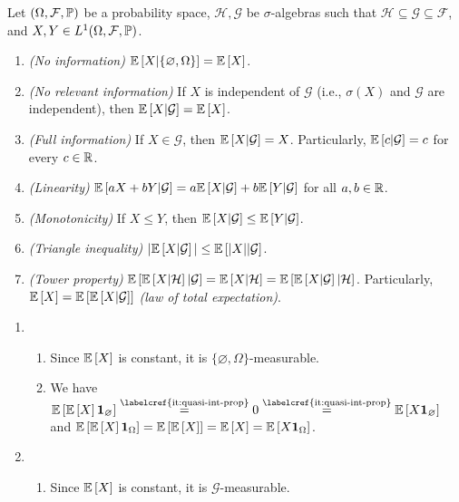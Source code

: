 \begin{enumerate}
\begin{proposition}
\label{prp:cond-exp-prop}
Let \((\Omega,\mathcal{F},\mathbb{P})\) be a probability space, \(\mathcal{H},\mathcal{G}\)
be \(\sigma\)-algebras such that \(\mathcal{H}\subseteq \mathcal{G}\subseteq
\mathcal{F}\), and \(X,Y\in L^{1}(\Omega,\mathcal{F},\mathbb{P})\).

\begin{enumerate}
\item \emph{(No information)} \(\mathbb{E}\left[X|\{\varnothing,\Omega\}\right]=\mathbb{E}\left[X\right]\).
\item \emph{(No relevant information)} If \(X\) is independent of
\(\mathcal{G}\) (i.e., \(\sigma(X)\) and \(\mathcal{G}\) are independent), then
\(\mathbb{E}\left[X|\mathcal{G}\right]=\mathbb{E}\left[X\right]\).
\item \emph{(Full information)} If \(X\in\mathcal{G}\), then \(\mathbb{E}\left[X|\mathcal{G}\right]=X\).
Particularly, \(\mathbb{E}\left[c|\mathcal{G}\right]=c\) for every \(c\in\mathbb{R}\).
\item \emph{(Linearity)}
\(\mathbb{E}\left[aX+bY|\mathcal{G}\right]=a\mathbb{E}\left[X|\mathcal{G}\right]+b\mathbb{E}\left[Y|\mathcal{G}\right]\) for
all \(a,b\in\mathbb{R}\).
\item \emph{(Monotonicity)} If \(X\le Y\), then
\(\mathbb{E}\left[X|\mathcal{G}\right]\le\mathbb{E}\left[Y|\mathcal{G}\right]\).
\item \emph{(Triangle inequality)} \(|\mathbb{E}\left[X|\mathcal{G}\right]|\le\mathbb{E}\left[|X||\mathcal{G}\right]\).
\item \emph{(Tower property)} \(\mathbb{E}\left[\mathbb{E}\left[X|\mathcal{H}\right]|\mathcal{G}\right]
=\mathbb{E}\left[X|\mathcal{H}\right]=\mathbb{E}\left[\mathbb{E}\left[X|\mathcal{G}\right]|\mathcal{H}\right]\).
Particularly, \(\mathbb{E}\left[X\right]=\mathbb{E}\left[\mathbb{E}\left[X|\mathcal{G}\right]\right]\) \emph{(law of total
expectation)}.
\end{enumerate}
\end{proposition}
\begin{pf}
\begin{enumerate}
\item \begin{enumerate}[label={(\arabic*)}]
\item Since \(\mathbb{E}\left[X\right]\) is constant, it is
\(\{\varnothing,\Omega\}\)-measurable.
\item We have
\(
\expv{\expv{X}\indic_{\varnothing}}
\overset{\text{\labelcref{it:quasi-int-prop}}}{=}
0\overset{\text{\labelcref{it:quasi-int-prop}}}{=}
\expv{X\indic_{\varnothing}}
\)
and
\(
\mathbb{E}\left[\mathbb{E}\left[X\right]\mathbf{1}_{\Omega}\right]
=\mathbb{E}\left[\mathbb{E}\left[X\right]\right]
=\mathbb{E}\left[X\right]
=\mathbb{E}\left[X\mathbf{1}_{\Omega}\right]
\).
\end{enumerate}
\item \begin{enumerate}[label={(\arabic*)}]
\item Since \(\mathbb{E}\left[X\right]\) is constant, it is \(\mathcal{G}\)-measurable.

\end{enumerate}
\end{enumerate}
\end{pf}
\end{enumerate}
